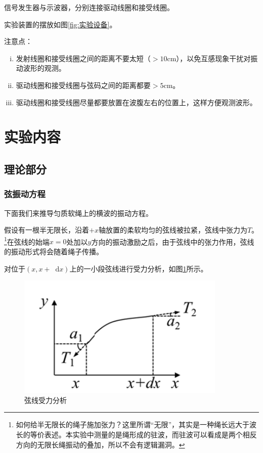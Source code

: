 \documentclass[a4paper,11pt]{article}
\newcommand*{\dif}{\mathop{}\!\mathrm{d}}
\begin{document}
    信号发生器与示波器，分别连接驱动线圈和接受线圈。

    实验装置的摆放如图\ref{fig:实验设备}。

    注意点：
    \begin{enumerate} [i.]
        \setlength{\itemindent}{2em}
        \item 发射线圈和接受线圈之间的距离不要太短（$>10$cm），以免互感现象干扰对振动波形的观测。
        \item 驱动线圈和接受线圈与弦码之间的距离都要$>5$cm。
        \item 驱动线圈和接受线圈尽量都要放置在波腹左右的位置上，这样方便观测波形。
    \end{enumerate}

\section{实验内容}
    \subsection{理论部分}
        \subsubsection{弦振动方程}
            下面我们来推导匀质软绳上的横波的振动方程。

            假设有一根半无限长，沿着$+x$轴放置的柔软均匀的弦线被拉紧，弦线中张力为$T$。\footnote{如何给半无限长的绳子施加张力？这里所谓“无限”，其实是一种绳长远大于波长的等价表述。本实验中测量的是绳形成的驻波，而驻波可以看成是两个相反方向的无限长绳振动的叠加，所以不会有逻辑漏洞。}在弦线的始端$x=0$处加以$y$方向的振动激励之后，由于弦线中的张力作用，弦线的振动形式将会随着绳子传播。

            对位于$(x, x+\dif x)$上的一小段弦线进行受力分析，如图\ref{fig:弦线受力分析}所示。

            \begin{figure}[ht]
                \centering
                \includegraphics[scale=0.7]{弦线受力分析.png}
                \caption{弦线受力分析}
                \label{fig:弦线受力分析}
            \end{figure}
\end{document}
